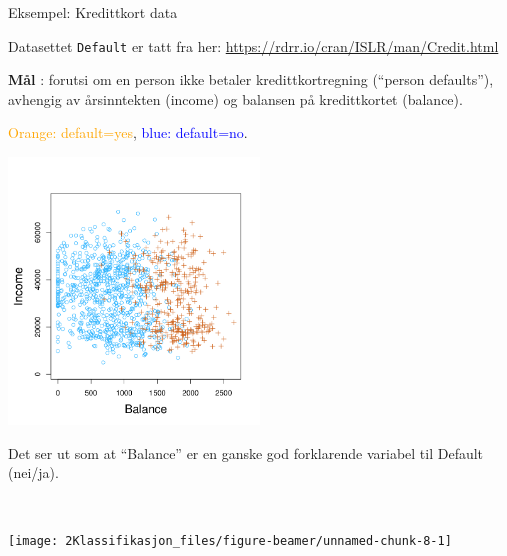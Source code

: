 \documentclass[10pt,ignorenonframetext,]{beamer}
\begin{document}
\begin{frame}[fragile]

\begin{block}{Eksempel: Kredittkort data}

\vspace{2mm}

Datasettet \texttt{Default} er tatt fra her:
\url{https://rdrr.io/cran/ISLR/man/Credit.html}

\vspace{2mm}

\textbf{Mål} : forutsi om en person ikke betaler kredittkortregning
(``person defaults''), avhengig av årsinntekten (income) og balansen på
kredittkortet (balance).

\textcolor{orange}{Orange: default=yes},
\textcolor{blue}{blue: default=no}.

\centering
\includegraphics[width=0.5\textwidth,height=\textheight]{4.1a.png}

\end{block}

\end{frame}

\begin{frame}

Det ser ut som at ``Balance'' er en ganske god forklarende variabel til
Default (nei/ja).

\(~\)

\begin{center}\texttt{[image: 2Klassifikasjon\_files/figure-beamer/unnamed-chunk-8-1]} \end{center}

\end{frame}
\end{document}
